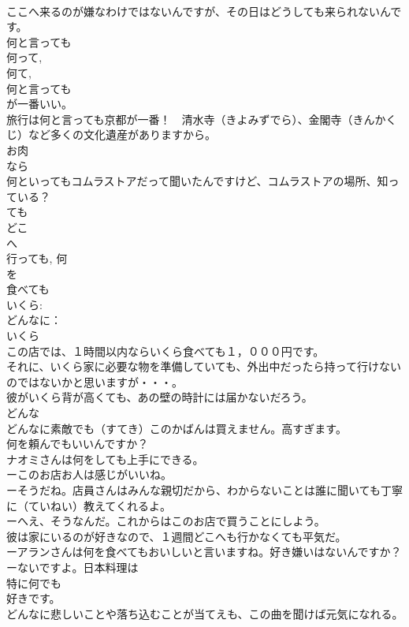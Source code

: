 \documentclass[8pt]{extreport}
\begin{document}
\begin{CJK}{UTF8}{min}
\\	ここへ来るのが嫌なわけではないんですが、その日はどうしても来られないんです。
\\	何と言っても
\\	何って, 
\\	何て, 
\\	何と言っても
\\	が一番いい。
\\	旅行は何と言っても京都が一番！　清水寺（きよみずでら）、金閣寺（きんかくじ）など多くの文化遺産がありますから。
\\	お肉
\\	なら
\\	何といってもコムラストアだって聞いたんですけど、コムラストアの場所、知っている？
\\	ても
\\	どこ
\\	へ
\\	行っても, 何
\\	を
\\	食べても
\\	いくら: 
\\	どんなに： 
\\	いくら 
\\	この店では、１時間以内ならいくら食べても１，０００円です。
\\	それに、いくら家に必要な物を準備していても、外出中だったら持って行けないのではないかと思いますが・・・。
\\	彼がいくら背が高くても、あの壁の時計には届かないだろう。
\\	どんな 
\\	どんなに素敵でも（すてき）このかばんは買えません。高すぎます。
\\	何を頼んでもいいんですか？
\\	ナオミさんは何をしても上手にできる。
\\	ーこのお店お人は感じがいいね。
\\	ーそうだね。店員さんはみんな親切だから、わからないことは誰に聞いても丁寧に（ていねい）教えてくれるよ。
\\	ーへえ、そうなんだ。これからはこのお店で買うことにしよう。
\\	彼は家にいるのが好きなので、１週間どこへも行かなくても平気だ。
\\	ーアランさんは何を食べてもおいしいと言いますね。好き嫌いはないんですか？
\\	ーないですよ。日本料理は
\\	特に何でも
\\	好きです。
\\	どんなに悲しいことや落ち込むことが当てえも、この曲を聞けば元気になれる。

\end{CJK}
\end{document}

